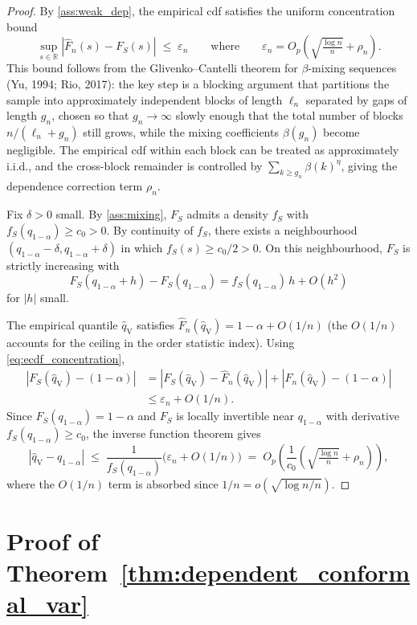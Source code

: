 \documentclass[11pt]{article}
\newcommand{\qV}{\hat{q}_{\scriptscriptstyle\mathrm{V}}}
\begin{document}
\begin{proof}
By \ref{ass:weak_dep}, the empirical cdf satisfies the uniform
concentration bound
\begin{equation}\label{eq:ecdf_concentration}
\sup_{s\in\mathbb R} |\hat F_n(s)-F_S(s)|
\;\le\; \varepsilon_n
\qquad\text{where}\qquad
\varepsilon_n = O_p\!\left(\sqrt{\tfrac{\log n}{n}}+\rho_n\right).
\end{equation}
This bound follows from the Glivenko--Cantelli theorem for
$\beta$-mixing sequences (Yu, 1994; Rio, 2017): the key step is a
blocking argument that partitions the sample into approximately
independent blocks of length $\ell_n$ separated by gaps of length
$g_n$, chosen so that $g_n \to \infty$ slowly enough that the
total number of blocks $n/(\ell_n+g_n)$ still grows, while the
mixing coefficients $\beta(g_n)$ become negligible. The empirical
cdf within each block can be treated as approximately i.i.d., and
the cross-block remainder is controlled by
$\sum_{k \ge g_n}\beta(k)^\eta$, giving the dependence correction
term $\rho_n$.

Fix $\delta > 0$ small. By \ref{ass:mixing}, $F_S$ admits a
density $f_S$ with $f_S(q_{1-\alpha})\ge c_0 >0$. By continuity of
$f_S$, there exists a neighbourhood
$(q_{1-\alpha}-\delta, q_{1-\alpha}+\delta)$ in which
$f_S(s)\ge c_0/2>0$. On this neighbourhood, $F_S$ is strictly
increasing with
\[
F_S(q_{1-\alpha}+h)-F_S(q_{1-\alpha})
= f_S(q_{1-\alpha})\,h + O(h^2)
\]
for $|h|$ small.

The empirical quantile $\qV$ satisfies
$\hat F_n(\qV) = 1-\alpha + O(1/n)$ (the $O(1/n)$ accounts for
the ceiling in the order statistic index). Using
\eqref{eq:ecdf_concentration},
\begin{align*}
|F_S(\qV) - (1-\alpha)|
&= |F_S(\qV) - \hat F_n(\qV)|
+ |\hat F_n(\qV)-(1-\alpha)| \\
&\le \varepsilon_n + O(1/n).
\end{align*}
Since $F_S(q_{1-\alpha})=1-\alpha$ and $F_S$ is locally
invertible near $q_{1-\alpha}$ with derivative
$f_S(q_{1-\alpha})\ge c_0$, the inverse function theorem gives
\[
|\qV - q_{1-\alpha}|
\;\le\; \frac{1}{f_S(q_{1-\alpha})}
\bigl(\varepsilon_n + O(1/n)\bigr)
\;=\; O_p\!\left(\frac{1}{c_0}
\left(\sqrt{\tfrac{\log n}{n}}+\rho_n\right)\right),
\]
where the $O(1/n)$ term is absorbed since
$1/n = o(\sqrt{\log n / n})$.
\end{proof}

\section{Proof of Theorem~\ref{thm:dependent_conformal_var}}
\end{document}
